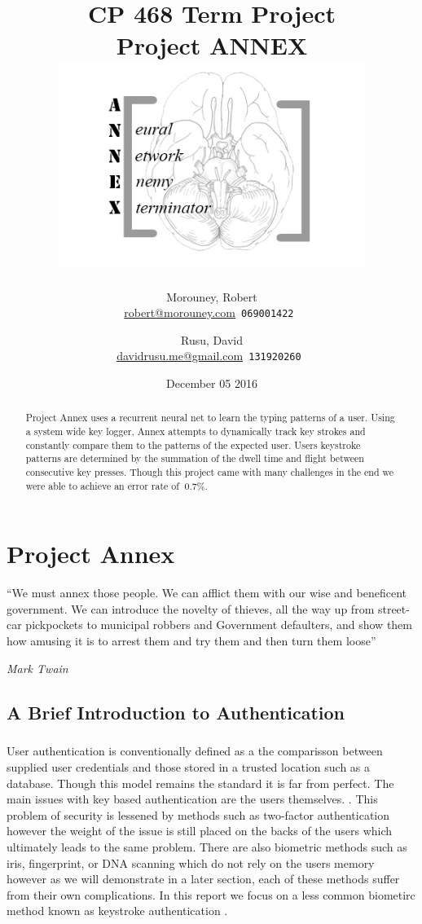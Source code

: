 \documentclass[fancychapters]{report}
\title{CP 468 Term Project \\ Project ANNEX \\ \includegraphics[width=0.75\textwidth]{logo}}
\author{
  Morouney, Robert\\
  \href{mailto:robert@morouney.com}{robert@morouney.com}\texttt{ 069001422 }
   \and
   Rusu, David\\
   \href{mailto:davidrusu.me@gmail.com}{davidrusu.me@gmail.com}\texttt{ 131920260 }
}
\date{December 05 2016}
\begin{document}
  \maketitle
\begin{abstract}
Project Annex uses a recurrent neural net to learn the typing patterns of a user.  Using a system wide key logger, Annex attempts to dynamically track key strokes and constantly compare them to the patterns of the expected user.  Users keystroke patterns are determined by the summation of the dwell time and flight between consecutive key presses. Though this project came with many challenges in the end we were able to achieve an error rate of $~0.7\%$.
\end{abstract}
\tableofcontents
\chapter{Project Annex}
\epigraph{``We must annex those people. We can afflict them 
with our wise and beneficent government. We can introduce 
the novelty of thieves, all the way up from street-car 
pickpockets to municipal robbers and Government defaulters, 
and show them how amusing it is to arrest them and try them and 
then turn them loose''}{ \textit{Mark Twain}}
\section{A Brief Introduction to Authentication}
\paragraph{}User authentication is conventionally defined as a the comparisson between supplied user credentials and those stored in a trusted location such as a database. \cite{AUTH1} 
Though this model remains the standard it is far from perfect. 
The main issues with key based authentication are the users themselves. \cite{BADUSER}. 
This problem of security is lessened by methods such as two-factor authentication however the weight of the issue is still placed on the backs of the users which ultimately leads to the same problem.
There are also biometric methods such as iris, fingerprint, or DNA scanning which do not rely on the users memory however as we will demonstrate in a later section, each of these methods suffer from their own complications.
In this report we focus on a less common biometirc method known as keystroke authentication \cite{BIOKEY1}.   
\end{document}
